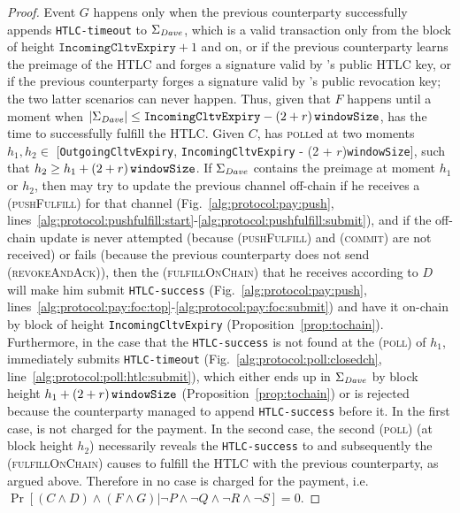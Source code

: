 \begin{proof}
  Event $G$ happens only when the previous counterparty successfully appends
  \texttt{HTLC-timeout} to $\Sigma_{\mathit{Dave}}$, which is a valid transaction only
  from the block of height $\mathtt{IncomingCltvExpiry} + 1$ and on, or if the
  previous counterparty learns the preimage of the HTLC and forges a signature
  valid by \dave's public HTLC key, or if the previous counterparty forges a
  signature valid by \dave's public revocation key; the two latter scenarios can
  never happen. Thus, given that $F$ happens until a moment when
  $|\Sigma_{\mathit{Dave}}| \leq \mathtt{IncomingCltvExpiry} - \left(2 + r\right)\texttt{windowSize}{}$, \dave{} has
  the time to successfully fulfill the HTLC. Given $C$, \dave{} has
  \textsc{poll}ed at two moments $h_1, h_2 \in$ [\texttt{OutgoingCltvExpiry},
  \texttt{IncomingCltvExpiry} - (2 + $r$)\texttt{windowSize}], such that $h_2
  \geq h_1 + \left(2 + r\right)\texttt{windowSize}{}$. If $\Sigma_{\mathit{Dave}}$ contains the preimage at moment
  $h_1$ or $h_2$, then \dave{} may try to update the previous channel off-chain
  if he receives a (\textsc{pushFulfill}) for that channel
  (Fig.~\ref{alg:protocol:pay:push},
  lines~\ref{alg:protocol:pushfulfill:start}-\ref{alg:protocol:pushfulfill:submit}),
  and if the off-chain update is never attempted (because (\textsc{pushFulfill})
  and (\textsc{commit}) are not received) or fails (because the previous
  counterparty does not send (\textsc{revokeAndAck})), then the
  (\textsc{fulfillOnChain}) that he receives according to $D$ will make him
  submit \texttt{HTLC-success} (Fig.~\ref{alg:protocol:pay:push},
  lines~\ref{alg:protocol:pay:foc:top}-\ref{alg:protocol:pay:foc:submit}) and
  have it on-chain by block of height \texttt{IncomingCltvExpiry}
  (Proposition~\ref{prop:tochain}). Furthermore, in the case that the
  \texttt{HTLC-success} is not found at the (\textsc{poll}) of $h_1$, \dave{}
  immediately submits \texttt{HTLC-timeout}
  (Fig.~\ref{alg:protocol:poll:closedch},
  line~\ref{alg:protocol:poll:htlc:submit}), which either ends up in
  $\Sigma_{\mathit{Dave}}$ by block height $h_1 + \left(2 + r\right)\texttt{windowSize}{}$
  (Proposition~\ref{prop:tochain}) or is rejected because the counterparty
  managed to append \texttt{HTLC-success} before it. In the first case, \dave{}
  is not charged for the payment. In the second case, the second (\textsc{poll})
  (at block height $h_2$) necessarily reveals the \texttt{HTLC-success} to
  \dave{} and subsequently the (\textsc{fulfillOnChain}) causes \dave{} to
  fulfill the HTLC with the previous counterparty, as argued above. Therefore in
  no case \dave{} is charged for the payment, i.e. $\Pr[(C \wedge D) \wedge (F
  \wedge G) | \neg P \wedge \neg Q \wedge \neg R \wedge \neg S] = 0$.


\end{proof}
